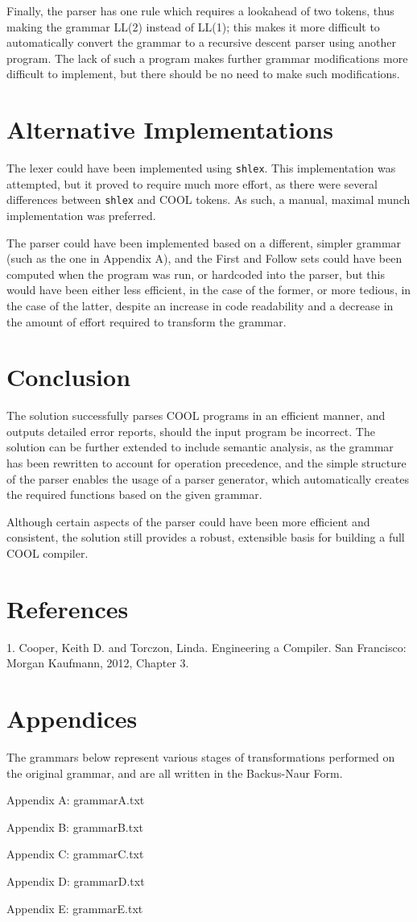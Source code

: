 \documentclass[10pt,a4paper,twocolumn]{article}
\begin{document}
Finally, the parser has one rule which requires a lookahead of two tokens, thus making the grammar LL(2) instead of LL(1); this makes it more difficult to automatically convert the grammar to a recursive descent parser using another program. The lack of such a program makes further grammar modifications more difficult to implement, but there should be no need to make such modifications.

\section*{Alternative Implementations}
The lexer could have been implemented using \texttt{shlex}. This implementation was attempted, but it proved to require much more effort, as there were several differences between \texttt{shlex} and COOL tokens. As such, a manual, maximal munch implementation was preferred.

The parser could have been implemented based on a different, simpler grammar (such as the one in Appendix A), and the First and Follow sets could have been computed when the program was run, or hardcoded into the parser, but this would have been either less efficient, in the case of the former, or more tedious, in the case of the latter, despite an increase in code readability and a decrease in the amount of effort required to transform the grammar.

\section*{Conclusion}
The solution successfully parses COOL programs in an efficient manner, and outputs detailed error reports, should the input program be incorrect. The solution can be further extended to include semantic analysis, as the grammar has been rewritten to account for operation precedence, and the simple structure of the parser enables the usage of a parser generator, which automatically creates the required functions based on the given grammar.

Although certain aspects of the parser could have been more efficient and consistent, the solution still provides a robust, extensible basis for building a full COOL compiler.

\section*{References}
1. Cooper, Keith D. and Torczon, Linda. Engineering a Compiler. San Francisco: Morgan Kaufmann, 2012, Chapter 3.

\section*{Appendices}
The grammars below represent various stages of transformations performed on the original grammar, and are all written in the Backus-Naur Form.

Appendix A: grammarA.txt

Appendix B: grammarB.txt

Appendix C: grammarC.txt

Appendix D: grammarD.txt

Appendix E: grammarE.txt
\end{document}
